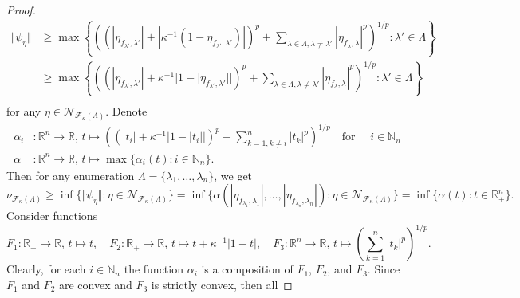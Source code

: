 \documentclass[12pt]{article}
\begin{document}
\begin{proof}
\[\begin{aligned}
        \Vert \psi_{\eta}\Vert
        &\geq\max\left\{
            \left(
                (
                    |\eta_{f_{\lambda'},\lambda'}|+
                    |\kappa^{-1}(1-\eta_{f_{\lambda'},\lambda'})|
                )^p
                +
                \sum_{\lambda\in\Lambda,\lambda\neq \lambda'}
                    |\eta_{f_\lambda,\lambda}|^p
            \right)^{1/p}:
            \lambda'\in\Lambda
        \right\} \\
        &\geq\max\left\{
            \left(
                (
                    |\eta_{f_{\lambda'},\lambda'}|+
                    \kappa^{-1}|1-|\eta_{f_{\lambda'},\lambda'}||
                )^p
                +
                \sum_{\lambda\in\Lambda,\lambda\neq \lambda'} 
                    |\eta_{f_\lambda,\lambda}|^p
            \right)^{1/p}:
            \lambda'\in\Lambda
        \right\} \\
    \end{aligned}
    \]
    for any $\eta\in\mathcal{N}_{\mathcal{F}_{\kappa}(\Lambda)}$. Denote
    \[
    \begin{aligned}
        \alpha_i&:\mathbb{R}^n\to\mathbb{R},\,
        t\mapsto \left(
            (|t_i|+\kappa^{-1}|1-|t_i||)^p+\sum_{k=1,k\neq i}^n |t_k|^p
        \right)^{1/p} \quad\text{for }\quad i\in\mathbb{N}_n \\
        \alpha&:\mathbb{R}^n\to\mathbb{R},\,
        t\mapsto\max\{\alpha_i(t):i\in\mathbb{N}_n\}.
    \end{aligned}
    \]
    Then for any enumeration $\Lambda=\{\lambda_1,\ldots,\lambda_n\}$, we get
    \[
        \nu_{\mathcal{F}_{\kappa}(\Lambda)}
        \geq\inf\{
            \Vert \psi_{\eta}\Vert : 
            \eta\in\mathcal{N}_{\mathcal{F}_{\kappa}(\Lambda)}
        \}
        =\inf\{
            \alpha(
                |\eta_{f_{\lambda_1},\lambda_1}|,
                \ldots,
                |\eta_{f_{\lambda_n},\lambda_n}|
            ) : 
            \eta\in\mathcal{N}_{\mathcal{F}_{\kappa}(\Lambda)}
        \}
        =\inf\{\alpha(t) : t\in\mathbb{R}_+^n\}.
    \]
    Consider functions
    \[
        F_1:\mathbb{R}_+\to\mathbb{R},\, 
            t\mapsto t, \quad
        F_2:\mathbb{R}_+\to\mathbb{R},\, 
            t\mapsto t+\kappa^{-1}|1-t|, \quad
        F_3:\mathbb{R}^n\to\mathbb{R},\, t\mapsto 
            \left(\sum_{k=1}^n|t_k|^p\right)^{1/p}.
    \]
    Clearly, for each $i\in\mathbb{N}_n$ the function $\alpha_i$ is a 
    composition of $F_1$, $F_2$, and $F_3$. Since $F_1$ and $F_2$ are convex 
    and $F_3$ is strictly convex, then all 

\end{proof}
\end{document}
